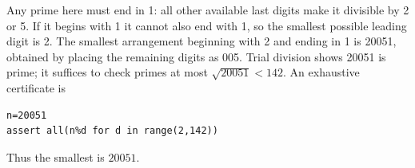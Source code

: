 Any prime here must end in 1: all other available last digits make it divisible by 2 or 5. If it begins with 1 it cannot also end with 1, so the smallest possible leading digit is 2. The smallest arrangement beginning with 2 and ending in 1 is 20051, obtained by placing the remaining digits as 005. Trial division shows 20051 is prime; it suffices to check primes at most $\sqrt{20051}<142$. An exhaustive certificate is\begin{verbatim}
n=20051
assert all(n%d for d in range(2,142))
\end{verbatim}
Thus the smallest is $\boxed{20051}$.

